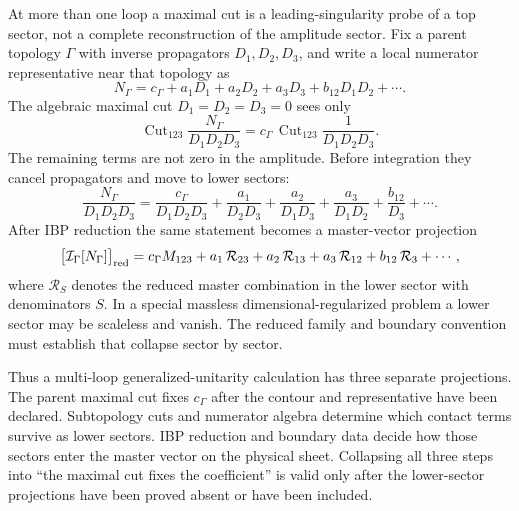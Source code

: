 \begin{controlledapproximation}
\label{ca:multi-loop-maximal-cut-sector-projection}
At more than one loop a maximal cut is a leading-singularity probe of a top
sector, not a complete reconstruction of the amplitude sector.  Fix a parent
topology \(\Gamma\) with inverse propagators \(D_1,D_2,D_3\), and write a local
numerator representative near that topology as
\[
  N_\Gamma
  =
  c_\Gamma
  +a_1D_1+a_2D_2+a_3D_3
  +b_{12}D_1D_2+\cdots .
\]
The algebraic maximal cut \(D_1=D_2=D_3=0\) sees only
\[
  \operatorname{Cut}_{123}
  \frac{N_\Gamma}{D_1D_2D_3}
  =
  c_\Gamma\,
  \operatorname{Cut}_{123}
  \frac{1}{D_1D_2D_3}.
\]
The remaining terms are not zero in the amplitude.  Before integration they
cancel propagators and move to lower sectors:
\begin{equation}
  \frac{N_\Gamma}{D_1D_2D_3}
  =
  \frac{c_\Gamma}{D_1D_2D_3}
  +\frac{a_1}{D_2D_3}
  +\frac{a_2}{D_1D_3}
  +\frac{a_3}{D_1D_2}
  +\frac{b_{12}}{D_3}
  +\cdots .
  \label{eq:multi-loop-contact-sector-cancellation}
\end{equation}
After IBP reduction the same statement becomes a master-vector projection
\begin{equation}
  \bigl[\mathcal I_\Gamma[N_\Gamma]\bigr]_{\rm red}
  =
  c_\Gamma M_{123}
  +a_1\,\mathcal R_{23}
  +a_2\,\mathcal R_{13}
  +a_3\,\mathcal R_{12}
  +b_{12}\,\mathcal R_{3}
  +\cdots ,
  \label{eq:multi-loop-cut-to-master-sector-projection}
\end{equation}
where \(\mathcal R_S\) denotes the reduced master combination in the lower
sector with denominators \(S\).  In a special massless dimensional-regularized
problem a lower sector may be scaleless and vanish.  The reduced family and
boundary convention must establish that collapse sector by sector.

Thus a multi-loop generalized-unitarity calculation has three separate
projections.  The parent maximal cut fixes \(c_\Gamma\) after the contour and
representative have been declared.  Subtopology cuts and numerator algebra
determine which contact terms survive as lower sectors.  IBP reduction and
boundary data decide how those sectors enter the master vector on the physical
sheet.  Collapsing all three steps into ``the maximal cut fixes the
coefficient'' is valid only after the lower-sector projections have been
proved absent or have been included.
\end{controlledapproximation}

